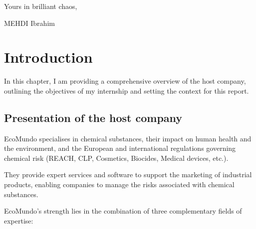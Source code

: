 \documentclass[a4paper,12pt,twoside]{report}
\begin{document}
Yours in brilliant chaos,

MEHDI Ibrahim

\newpage

\begin{abstract}

\end{abstract}

\newpage
{}
\begin{abstract}

\end{abstract}

\newpage


\tableofcontents{}

\thispagestyle{empty}

\newpage

\listoffigures  %


\thispagestyle{empty}

\newpage
\thispagestyle{empty}
\listoftables   %
\thispagestyle{empty}

\printglossary[type=\acronymtype]

\thispagestyle{empty}

\newpage

\chapter{Introduction}
In this chapter, I am providing a comprehensive overview of the host company, outlining the objectives of my internship and setting the context for this report.
\section{Presentation of the host company}
EcoMundo \cite{ecomundo} specialises in chemical substances, their impact on human health and the environment, and the European and international regulations governing chemical risk (REACH, CLP, Cosmetics, Biocides, Medical devices, etc.).

They provide expert services and software to support the marketing of industrial products, enabling companies to manage the risks associated with chemical substances.

EcoMundo's strength lies in the combination of three complementary fields of expertise:
\end{document}

